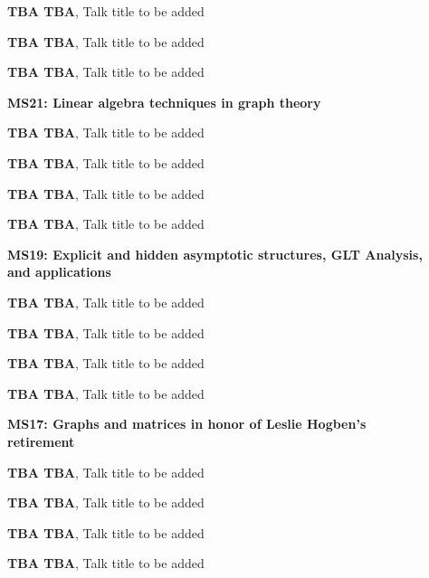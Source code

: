 \documentclass[ILAS2025-program.tex]{subfiles}
\begin{document}
\begin{description}
\begin{description}
        \item[] \textbf{TBA TBA}, Talk title to be added
        \item[] \textbf{TBA TBA}, Talk title to be added
        \item[] \textbf{TBA TBA}, Talk title to be added
        \end{description}
    \begin{description}
    \item[] \textbf{MS21: Linear algebra techniques in graph theory} 
    \item[] \textbf{TBA TBA}, Talk title to be added
        \item[] \textbf{TBA TBA}, Talk title to be added
        \item[] \textbf{TBA TBA}, Talk title to be added
        \item[] \textbf{TBA TBA}, Talk title to be added
        \end{description}
    \begin{description}
    \item[] \textbf{MS19: Explicit and hidden asymptotic structures, GLT Analysis, and applications} 
    \item[] \textbf{TBA TBA}, Talk title to be added
        \item[] \textbf{TBA TBA}, Talk title to be added
        \item[] \textbf{TBA TBA}, Talk title to be added
        \item[] \textbf{TBA TBA}, Talk title to be added
        \end{description}
    \begin{description}
    \item[] \textbf{MS17: Graphs and matrices in honor of Leslie Hogben's retirement} 
    \item[] \textbf{TBA TBA}, Talk title to be added
        \item[] \textbf{TBA TBA}, Talk title to be added
        \item[] \textbf{TBA TBA}, Talk title to be added
        \item[] \textbf{TBA TBA}, Talk title to be added

\end{description}
\end{description}
\end{document}
